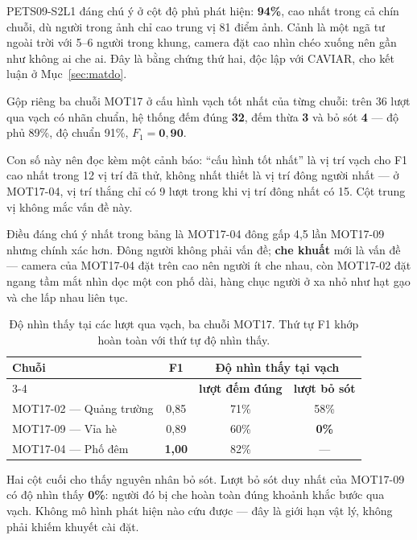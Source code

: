 PETS09-S2L1 đáng chú ý ở cột độ phủ phát hiện: \textbf{94\%}, cao nhất trong cả chín
chuỗi, dù người trong ảnh chỉ cao trung vị 81 điểm ảnh. Cảnh là một ngã tư ngoài trời
với 5--6 người trong khung, camera đặt cao nhìn chéo xuống nên gần như không ai che ai.
Đây là bằng chứng thứ hai, độc lập với CAVIAR, cho kết luận ở Mục~\ref{sec:matdo}.

Gộp riêng ba chuỗi MOT17 ở cấu hình vạch tốt nhất của từng chuỗi: trên 36 lượt qua vạch
có nhãn chuẩn, hệ thống đếm đúng \textbf{32}, đếm thừa \textbf{3} và bỏ sót \textbf{4}
--- độ phủ 89\%, độ chuẩn 91\%, $F_1 = \mathbf{0{,}90}$.

Con số này nên đọc kèm một cảnh báo: ``cấu hình tốt nhất'' là vị trí vạch cho F1 cao nhất
trong 12 vị trí đã thử, không nhất thiết là vị trí đông người nhất --- ở MOT17-04, vị trí
thắng chỉ có 9 lượt trong khi vị trí đông nhất có 15. Cột trung vị không mắc vấn đề này.

Điều đáng chú ý nhất trong bảng là MOT17-04 đông gấp 4{,}5 lần MOT17-09 nhưng chính xác
hơn. Đông người không phải vấn đề; \textbf{che khuất} mới là vấn đề --- camera của
MOT17-04 đặt trên cao nên người ít che nhau, còn MOT17-02 đặt ngang tầm mắt nhìn dọc
một con phố dài, hàng chục người ở xa nhỏ như hạt gạo và che lấp nhau liên tục.

\begin{table}[H]
\centering
\caption{Độ nhìn thấy tại các lượt qua vạch, ba chuỗi MOT17. Thứ tự F1 khớp hoàn toàn
với thứ tự độ nhìn thấy.}
\label{tab:mot17-canh}
\small
\begin{tabularx}{\textwidth}{@{}Xccc@{}}
\toprule
\multirow{2}{*}{\textbf{Chuỗi}} & \multirow{2}{*}{\textbf{F1}} &
\multicolumn{2}{c}{\textbf{Độ nhìn thấy tại vạch}} \\
\cmidrule(lr){3-4}
 & & \textbf{lượt đếm đúng} & \textbf{lượt bỏ sót} \\
\midrule
MOT17-02 --- Quảng trường & 0{,}85 & 71\% & 58\% \\
MOT17-09 --- Vỉa hè       & 0{,}89 & 60\% & \textbf{0\%} \\
MOT17-04 --- Phố đêm      & \textbf{1{,}00} & 82\% & --- \\
\bottomrule
\end{tabularx}
\end{table}

Hai cột cuối cho thấy nguyên nhân bỏ sót. Lượt bỏ sót duy nhất của MOT17-09 có độ nhìn
thấy \textbf{0\%}: người đó bị che hoàn toàn đúng khoảnh khắc bước qua vạch. Không mô
hình phát hiện nào cứu được --- đây là giới hạn vật lý, không phải khiếm khuyết cài đặt.

